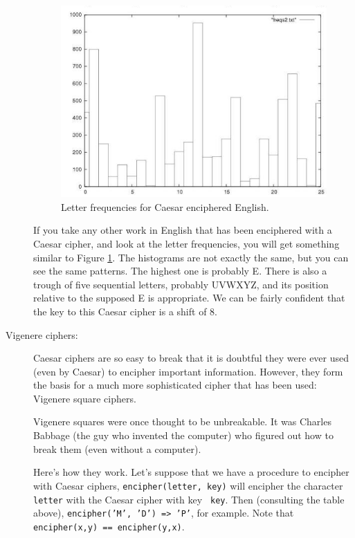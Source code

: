 \documentclass{article}
\begin{document}
\begin{description}
\begin{figure}
  \begin{center}
    \includegraphics[scale=0.5]{freqhist02.png}
  \end{center}
  \caption{Letter frequencies for Caesar enciphered English.}
  \label{encipheredfrequencies}
\end{figure}

If you take any other work in English that has been enciphered with a
Caesar cipher, and look at the letter frequencies, you will get
something similar to Figure \ref{encipheredfrequencies}.  The
histograms are not exactly the same, but you can see the same
patterns.  The highest one is probably E.  There is also a trough of
five sequential letters, probably UVWXYZ, and its position relative to
the supposed E is appropriate.  We can be fairly confident that the
key to this Caesar cipher is a shift of 8.

\item[Vigenere ciphers:]  Caesar ciphers are so easy to break that it
  is doubtful they were ever used (even by Caesar) to encipher
  important information.  However, they form the basis for a much more
  sophisticated cipher that has been used:  Vigenere square ciphers.

Vigenere squares were once thought to be unbreakable.  It was Charles
Babbage (the guy who invented the computer) who figured out how to
break them (even without a computer).

Here's how they work.  Let's suppose that we have a procedure to
encipher with Caesar ciphers, {\tt encipher(letter, key)} will
encipher the character {\tt letter} with the Caesar cipher with key {\tt
  key}.  Then (consulting the table above), {\tt encipher('M', 'D') =>
  'P'}, for example.  Note that {\tt encipher(x,y) == encipher(y,x)}.


\end{description}
\end{document}
